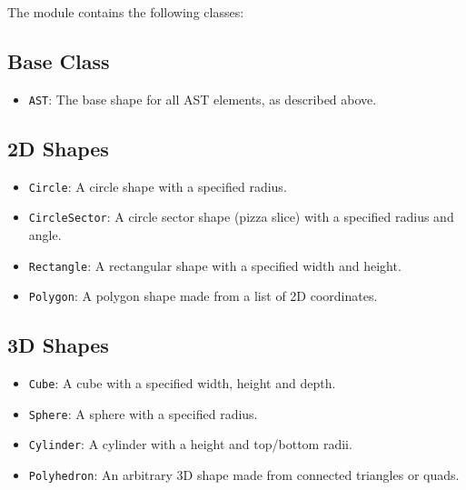 \noindent The module contains the following classes:

\subsection*{Base Class}

\begin{itemize}
	\item \texttt{AST}: The base shape for all AST elements, as described above.
\end{itemize}

\subsection*{2D Shapes}

\begin{itemize}
	\item \texttt{Circle}: A circle shape with a specified radius.
	\item \texttt{CircleSector}: A circle sector shape (pizza slice) with a
		specified radius and angle.
	\item \texttt{Rectangle}: A rectangular shape with a specified width and
		height.
	\item \texttt{Polygon}: A polygon shape made from a list of 2D coordinates.
\end{itemize}

\subsection*{3D Shapes}

\begin{itemize}
	\item \texttt{Cube}: A cube with a specified width, height and depth.
	\item \texttt{Sphere}: A sphere with a specified radius.
	\item \texttt{Cylinder}: A cylinder with a height and top/bottom radii.
	\item \texttt{Polyhedron}: An arbitrary 3D shape made from connected triangles
		or quads.
\end{itemize}

